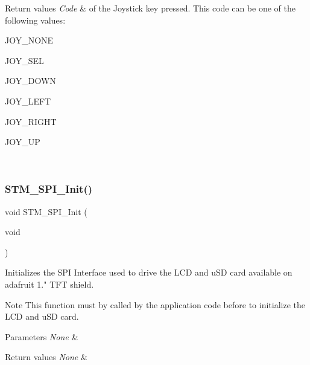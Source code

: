 \begin{DoxyRetVals}{Return values}
{\em Code} & of the Joystick key pressed. This code can be one of the following values\+: \begin{DoxyItemize}
\item J\+O\+Y\+\_\+\+N\+O\+NE \item J\+O\+Y\+\_\+\+S\+EL \item J\+O\+Y\+\_\+\+D\+O\+WN \item J\+O\+Y\+\_\+\+L\+E\+FT \item J\+O\+Y\+\_\+\+R\+I\+G\+HT \item J\+O\+Y\+\_\+\+UP \end{DoxyItemize}
\\
\hline
\end{DoxyRetVals}
\mbox{\label{group___s_t_m32_f1_x_x___n_u_c_l_e_o___l_o_w___l_e_v_e_l___exported___functions_ga7738cdccebd6af452a4843906acb8b31}} 
\subsubsection{\texorpdfstring{STM\_SPI\_Init()}{STM\_SPI\_Init()}}
{\footnotesize\ttfamily void S\+T\+M\+\_\+\+S\+P\+I\+\_\+\+Init (\begin{DoxyParamCaption}\item[{void}]{ }\end{DoxyParamCaption})}



Initializes the S\+PI Interface used to drive the L\+CD and u\+SD card available on adafruit 1." T\+FT shield. 

\begin{DoxyNote}{Note}
This function must by called by the application code before to initialize the L\+CD and u\+SD card.
\end{DoxyNote}

\begin{DoxyParams}{Parameters}
{\em None} & \\
\hline
\end{DoxyParams}

\begin{DoxyRetVals}{Return values}
{\em None} & \\
\hline
\end{DoxyRetVals}
\mbox{\label{group___s_t_m32_f1_x_x___n_u_c_l_e_o___l_o_w___l_e_v_e_l___exported___functions_ga018a36360d14b84d8e0e0b2d2471d673}} 
